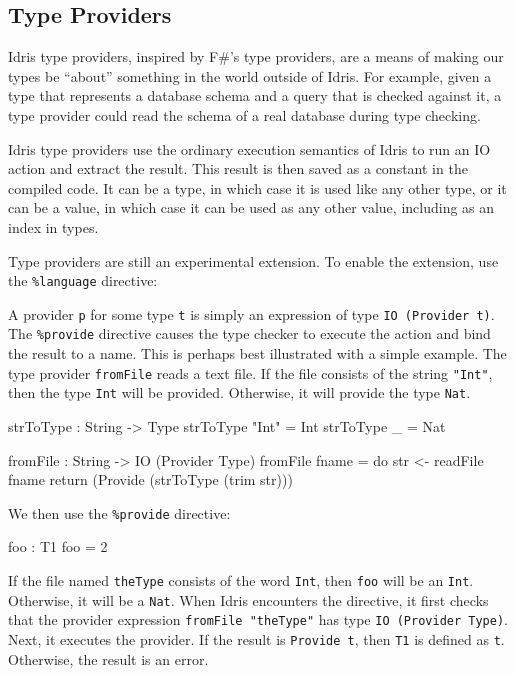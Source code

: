 
\subsection{Type Providers}
Idris type providers, inspired by F\#'s type providers, are a means of making our types be ``about'' something in the world outside of Idris.
For example, given a type that represents a database schema and a query that is checked against it, a type provider could read the schema of a real database during type checking.

Idris type providers use the ordinary execution semantics of Idris to run an IO action and extract the result.
This result is then saved as a constant in the compiled code.
It can be a type, in which case it is used like any other type, or it can be a value, in which case it can be used as any other value, including as an index in types.

Type providers are still an experimental extension. To enable the extension, use the \texttt{\%language} directive:

\begin{code}
\end{code}

A provider \texttt{p} for some type \texttt{t} is simply an expression of type \texttt{IO (Provider t)}.
The \texttt{\%provide} directive causes the type checker to execute the action and bind the result to a name.
This is perhaps best illustrated with a simple example.
The type provider \texttt{fromFile} reads a text file.
If the file consists of the string \texttt{"Int"}, then the type \texttt{Int} will be provided.
Otherwise, it will provide the type \texttt{Nat}.

\begin{code}
strToType : String -> Type
strToType "Int" = Int
strToType _ = Nat

fromFile : String -> IO (Provider Type)
fromFile fname = do str <- readFile fname
                    return (Provide (strToType (trim str)))
\end{code}

We then use the \texttt{\%provide} directive:

\begin{code}

foo : T1
foo = 2
\end{code}

\noindent
If the file named \texttt{theType} consists of the word \texttt{Int}, then \texttt{foo} will be an \texttt{Int}. Otherwise, it will be a \texttt{Nat}.
When Idris encounters the directive, it first checks that the provider expression \texttt{fromFile "theType"} has type \texttt{IO (Provider Type)}.
Next, it executes the provider. If the result is \texttt{Provide t}, then \texttt{T1} is defined as \texttt{t}. 
Otherwise, the result is an error.

